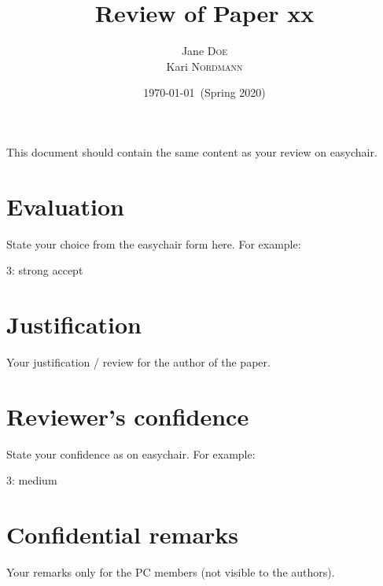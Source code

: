 \documentclass[11pt, a4paper]{article}
\title{Review of Paper xx}
\author{Jane \textsc{Doe}\\
Kari \textsc{Nordmann}}
\date{\today~(Spring 2020)}
\begin{document}


This document should contain the same content as your review on easychair.

\section*{Evaluation}

State your choice from the easychair form here. For example:

3: strong accept

\section*{Justification}

Your justification / review for the author of the paper. 

\section*{Reviewer's confidence}

State your confidence as on easychair. For example:

3: medium

\section*{Confidential remarks}

Your remarks only for the PC members (not visible to the authors).

\end{document}

